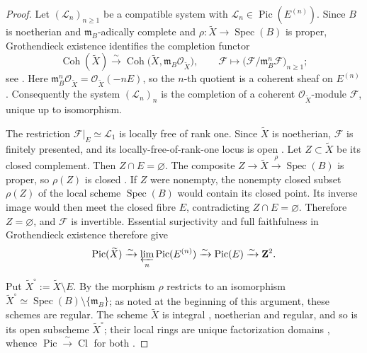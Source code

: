 \documentclass[10pt]{amsart}
\DeclareMathOperator{\Pic}{Pic}
\DeclareMathOperator{\Cl}{Cl}
\DeclareMathOperator{\Spec}{Spec}
\theoremstyle{remark}
\begin{document}
\begin{proof}
	
	Let
	\(
	(\mathcal L_n)_{n\geq1}
	\)
	be a compatible system with
	\(\mathcal L_n\in\Pic(E^{(n)})\). Since \(B\) is noetherian and
	\(\mathfrak m_B\)-adically complete and
	\(\rho\colon\widetilde X\to\Spec(B)\) is proper, Grothendieck
	existence identifies the completion functor
	\[
	\operatorname{Coh}(\widetilde X)
	\xrightarrow{\ \sim\ }
	\operatorname{Coh}
	\bigl(\widetilde X,
	\mathfrak m_B\mathcal O_{\widetilde X}\bigr),
	\qquad
	\mathcal F\longmapsto
	\bigl(\mathcal F/\mathfrak m_B^n\mathcal F\bigr)_{n\geq1};
	\]
	see \cite[Tag~088C]{StacksProject}. Here
	\(
	\mathfrak m_B^n\mathcal O_{\widetilde X}
	=\mathcal O_{\widetilde X}(-nE)
	\),
	so the \(n\)-th quotient is a coherent sheaf on \(E^{(n)}\).
	Consequently the system \((\mathcal L_n)_n\) is the completion of a
	coherent \(\mathcal O_{\widetilde X}\)-module \(\mathcal F\), unique
	up to isomorphism.
	
	The restriction
	\(\mathcal F|_E\simeq\mathcal L_1\) is locally free of rank one.
	Since \(\widetilde X\) is noetherian, \(\mathcal F\) is finitely
	presented, and its locally-free-of-rank-one locus is open
	\cite[Tag~05GD]{StacksProject}. Let \(Z\subset\widetilde X\) be its
	closed complement. Then \(Z\cap E=\varnothing\). The composite
	\(
	Z\longrightarrow\widetilde X\xrightarrow{\rho}\Spec(B)
	\)
	is proper, so \(\rho(Z)\) is closed
	\cite[Tag~01W6]{StacksProject}. If \(Z\) were nonempty, the nonempty
	closed subset \(\rho(Z)\) of the local scheme \(\Spec(B)\) would
	contain its closed point. Its inverse image would then meet the
	closed fibre \(E\), contradicting \(Z\cap E=\varnothing\).
	Therefore \(Z=\varnothing\), and \(\mathcal F\) is invertible.
	Essential surjectivity and full faithfulness in Grothendieck existence
	therefore give
	\[
	\Pic(\widetilde X)
	\xrightarrow{\sim}
	\varprojlim_n\Pic(E^{(n)})
	\xrightarrow{\sim}
	\Pic(E)
	\xrightarrow{\sim}
	\mathbf Z^2.
	\]
	
	
	
	
	
	Put \(\widetilde X^\circ:=\widetilde X\setminus E\).  By
	\cite[Tag~02OS]{StacksProject} the morphism \(\rho\) restricts to an
	isomorphism
	\(\widetilde X^\circ\simeq\Spec(B)\setminus\{\mathfrak m_B\}\); as noted
	at the beginning of this argument, these schemes are regular.  The
	scheme \(\widetilde X\) is integral \cite[Tag~02ND]{StacksProject},
	noetherian and regular, and so is its open subscheme
	\(\widetilde X^\circ\); their local rings are unique factorization
	domains \cite[Tag~0AG0]{StacksProject}, whence
	\(\Pic\xrightarrow{\ \sim\ }\Cl\) for both
	\cite[Tag~0BE9]{StacksProject}.
	

\end{proof}
\end{document}
